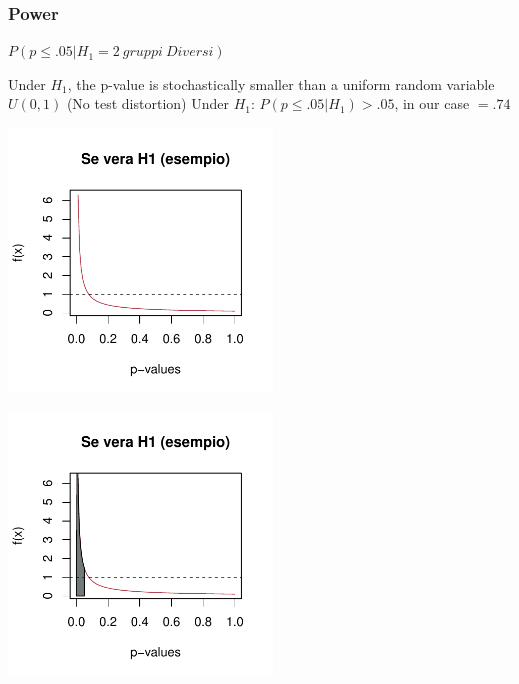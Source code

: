 \documentclass[xcolor={pdftex,dvipsnames,table}]{beamer}
\begin{document}
\begin{frame}
\frametitle{Power}

$P(p\leq .05 | H_1=2\ gruppi\ Diversi)$
\begin{overprint}
 {Under $H_1$, the p-value is stochastically smaller than a uniform random variable $U(0,1)$ (No test distortion)}
 {Under $H_1$: $P(p\leq .05 |H_1)>.05$, in our case $= .74$\\ }
\end{overprint}
\begin{overprint} 
 \centerline{\includegraphics[width=7cm]{plaatjes/beta1}}
 \centerline{\includegraphics[width=7cm]{plaatjes/beta2}}
\end{overprint} 
\end{frame}
\end{document}
